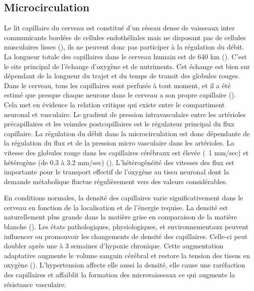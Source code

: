 \subsection{Microcirculation}
Le lit capillaire du cerveau est constitué d’un réseau dense de vaisseaux inter communicants
bordées de cellules endothéliales mais ne disposant pas de cellules musculaires lisses (\cite{Rennels1975}), ils ne
peuvent donc pas participer à la régulation du débit. La longueur totale des capillaires dans le cerveau
humain est de 640 km (\cite{Abbott2010}). C’est le site principal de l’échange d’oxygène et de nutriments. Cet échange
est bien sur dépendant de la longueur du trajet et du temps de transit des globules rouges. Dans le
cerveau, tous les capillaires sont perfusés à tout moment, et il a été estimé que presque chaque
neurone dans le cerveau a son propre capillaire (\cite{Zlokovic2005}). Cela met en évidence la relation critique qui existe
entre le compartiment neuronal et vasculaire. Le gradient de pression intravasculaire entre les
artérioles précapillaires et les veinules postcapillaires est le régulateur principal du flux capillaire. La
régulation du débit dans la microcirculation est donc dépendante de la régulation du flux et de la
pression micro vasculaire dans les artérioles. La vitesse des globules rouge dans les capillaires cérébraux est élevée (~1 mm/sec) et hétérogène (de 0.3 à 3.2 mm/sec) (\cite{Wei1993}). L’hétérogénéité des
vitesses des flux est importante pour le transport effectif de l’oxygène au tissu neuronal dont la
demande métabolique fluctue régulièrement vers des valeurs considérables.

En conditions normales, la densité des capillaires varie significativement dans le cerveau en
fonction de la localisation et de l’énergie requise. La densité est naturellement plus grande dans la
matière grise en comparaison de la matière blanche (\cite{Klein1986}). Les états pathologiques, physiologiques, et
environnementaux peuvent influencer ou promouvoir les changements de densité des capillaires.
Celle-ci peut doubler après une à 3 semaines d’hypoxie chronique. Cette augmentation adaptative
augmente le volume sanguin cérébral et restore la tension des tissus en oxygène (\cite{Cipolla2009}). L’hypertension
affecte elle aussi la densité, elle cause une raréfaction des capillaires et affaiblit la formation des
microvaisseaux ce qui augmente la résistance vasculaire.

